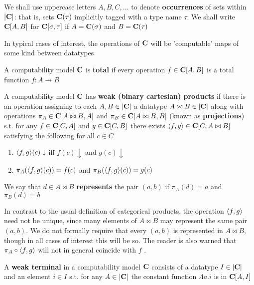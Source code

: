 \documentclass[11pt]{article}
\begin{document}
We shall use uppercase letters \(A,B,C,\dots\) to denote \textbf{occurrences} of sets within \(\abs{\bC}\):
that is, sets \(\operatorname{\textbf{C}}(\tau)\) implicitly tagged with a type name \(\tau\). We shall write \(\operatorname{\textbf{C}}[A,B]\)
for \(\operatorname{\textbf{C}}[\sigma,\tau]\) if \(A=\operatorname{\textbf{C}}(\sigma)\) and \(B=\operatorname{\textbf{C}}(\tau)\)

In typical cases of interest, the operations of \(\operatorname{\textbf{C}}\) will be 'computable' maps of some kind between datatypes

\begin{definition}[]
A computability model \(\operatorname{\textbf{C}}\) is \textbf{total} if every operation \(f\in\operatorname{\textbf{C}}[A,B]\) is a total
function \(f:A\to B\)
\end{definition}

\begin{definition}[]
A computability model \(\operatorname{\textbf{C}}\) has \textbf{weak (binary cartesian) products} if there is an operation
assigning to each \(A,B\in\abs{\bC}\) a datatype \(A\bowtie B\in\abs{\bC}\) along with
operations \(\pi_A\in\operatorname{\textbf{C}}[A\bowtie B,A]\) and \(\pi_B\in\operatorname{\textbf{C}}[A\bowtie B,B]\) (known as \textbf{projections}) s.t. for
any \(f\in\operatorname{\textbf{C}}[C,A]\) and \(g\in\operatorname{\textbf{C}}[C,B]\) there exists \(\langle f,g\rangle\in\operatorname{\textbf{C}}[C,A\bowtie B]\) satisfying the following for
all \(c\in C\)
\begin{enumerate}
\item \(\langle f,g\rangle(c)\downarrow\) iff \(f(c)\downarrow\) and \(g(c)\downarrow\)
\item \(\pi_A(\langle f,g\rangle(c))=f(c)\) and \(\pi_B(\langle f,g\rangle(c))=g(c)\)
\end{enumerate}


We say that \(d\in A\bowtie B\) \textbf{represents} the pair \((a,b)\) if \(\pi_A(d)=a\) and \(\pi_B(d)=b\)
\end{definition}

In contrast to the usual definition of categorical products, the operation \(\langle f,g\rangle\) need not be
unique, since many elements of \(A\bowtie B\) may represent the same pair \((a,b)\). We do not formally
require that every \((a,b)\) is represented in \(A\bowtie B\), though in all cases of interest this will be
so. The reader is also warned that \(\pi_A\circ\langle f,g\rangle\) will not in general coincide with \(f\) .

\begin{definition}[]
A \textbf{weak terminal} in a computability model \(\operatorname{\textbf{C}}\) consists of a datatype \(I\in\abs{\bC}\) and an
element \(i\in I\) s.t. for any \(A\in\abs{\bC}\) the constant function \(\Lambda a.i\) is in \(\operatorname{\textbf{C}}[A,I]\)
\end{definition}
\end{document}
